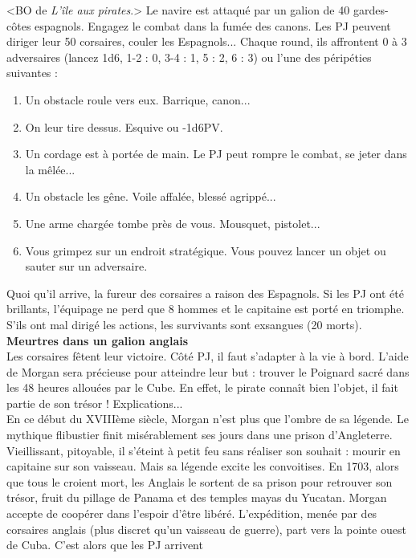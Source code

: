 \documentclass[11pt,twoside,a4paper]{book}
\begin{document}
<BO de \emph{L'{\^i}le aux pirates}.> Le navire est attaqu{\'e} par un galion de 40 gardes-c{\^o}tes espagnols. Engagez le combat dans la fum{\'e}e des canons. Les PJ peuvent diriger leur 50 corsaires, couler les Espagnols... Chaque round, ils affrontent 0 {\`a} 3 adversaires (lancez 1d6, 1-2 : 0, 3-4 : 1, 5 : 2, 6 : 3) ou l'une des p{\'e}rip{\'e}ties suivantes :
\setlength\parindent{20pt}
\begin{enumerate}
	\item Un obstacle roule vers eux. Barrique, canon...
	\item On leur tire dessus. Esquive ou -1d6PV.
	\item Un cordage est {\`a} port{\'e}e de main. Le PJ peut rompre le combat, se jeter dans la m{\^e}l{\'e}e...
	\item Un obstacle les g{\^e}ne. Voile affal{\'e}e, bless{\'e} agripp{\'e}...
	\item Une arme charg{\'e}e tombe pr{\`e}s de vous. Mousquet, pistolet...
	\item Vous grimpez sur un endroit strat{\'e}gique. Vous pouvez lancer un objet ou sauter sur un adversaire.
\end{enumerate}
\setlength\parindent{0pt}
Quoi qu'il arrive, la fureur des corsaires a raison des Espagnols. Si les PJ ont {\'e}t{\'e} brillants, l'{\'e}quipage ne perd que 8 hommes et le capitaine est port{\'e} en triomphe. S'ils ont mal dirig{\'e} les actions, les survivants sont exsangues (20 morts).~\\

\textbf{\large Meurtres dans un galion anglais}~\\

Les corsaires f{\^e}tent leur victoire. C{\^o}t{\'e} PJ, il faut s'adapter {\`a} la vie {\`a} bord. L'aide de Morgan sera pr{\'e}cieuse pour atteindre leur but : trouver le Poignard sacr{\'e} dans les 48 heures allou{\'e}es par le Cube. En effet, le pirate conna{\^i}t bien l'objet, il fait partie de son tr{\'e}sor ! Explications...~\\

En ce d{\'e}but du XVIII{\`e}me si{\`e}cle, Morgan n'est plus que l'ombre de sa l{\'e}gende. Le mythique flibustier finit mis{\'e}rablement ses jours dans une prison d'Angleterre. Vieillissant, pitoyable, il s'{\'e}teint {\`a} petit feu sans r{\'e}aliser son souhait : mourir en capitaine sur son vaisseau. Mais sa l{\'e}gende excite les convoitises. En 1703, alors que tous le croient mort, les Anglais le sortent de sa prison pour retrouver son tr{\'e}sor, fruit du pillage de Panama et des temples mayas du Yucatan. Morgan accepte de coop{\'e}rer dans l'espoir d'{\^e}tre lib{\'e}r{\'e}. L'exp{\'e}dition, men{\'e}e par des corsaires anglais (plus discret qu'un vaisseau de guerre), part vers la pointe ouest de Cuba. C'est alors que les PJ arrivent ~\\
\end{document}
